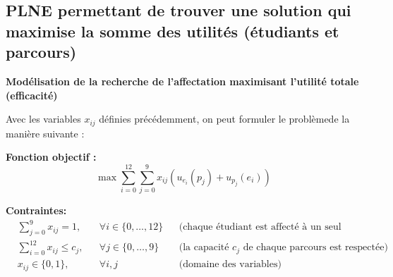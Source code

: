 \documentclass{article}
\begin{document}
 \newpage
\subsection{PLNE permettant de trouver une solution qui maximise la somme des utilités (étudiants et parcours)}

\noindent\textbf{Modélisation de la recherche de l'affectation maximisant l'utilité totale (efficacité)}

Avec les variables $x_{ij}$ définies précédemment, on peut formuler le problèmede la manière suivante :

\vspace{0.1cm}
\noindent\textbf{Fonction objectif :} 
\[ \max \sum_{i=0}^{12} \sum_{j=0}^{9} x_{ij}\left(u_{e_i}(p_j) + u_{p_j}(e_i)\right) \]

\noindent\textbf{Contraintes:}
\begin{align*}
& \sum_{j=0}^{9} x_{ij} = 1, && \forall i \in \{0,\dots,12\} && \text{(chaque étudiant est affecté à un seul parcours)} \\
& \sum_{i=0}^{12} x_{ij} \leq c_j, && \forall j \in \{0,\dots,9\} && \text{(la capacité $c_j$ de chaque parcours est respectée)} \\
& x_{ij} \in \{0, 1\}, && \forall i, j && \text{(domaine des variables)}
\end{align*}
\end{document}
